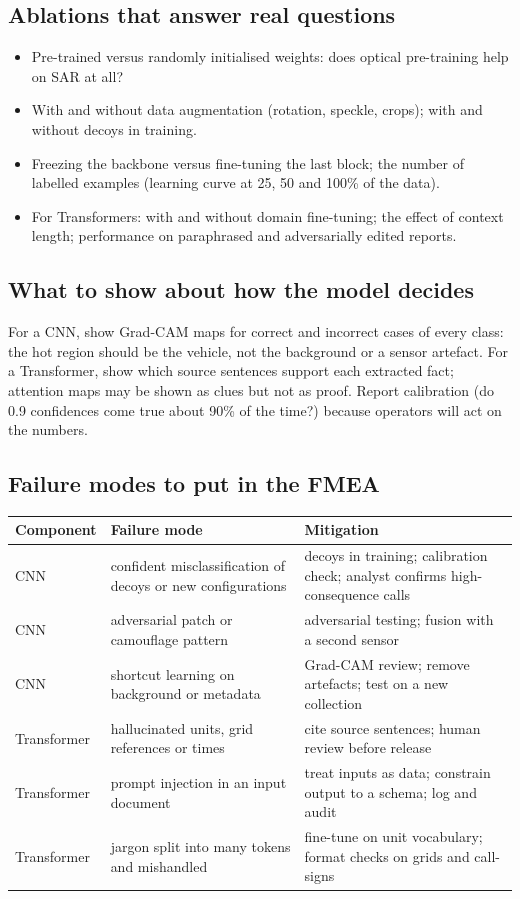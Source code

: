 \documentclass[11pt]{article}
\begin{document}
\subsection{Ablations that answer real questions}
\begin{itemize}
\item Pre-trained versus randomly initialised weights: does optical pre-training help on SAR at all?
\item With and without data augmentation (rotation, speckle, crops); with and without decoys in training.
\item Freezing the backbone versus fine-tuning the last block; the number of labelled examples (learning curve at 25, 50 and 100\% of the data).
\item For Transformers: with and without domain fine-tuning; the effect of context length; performance on paraphrased and adversarially edited reports.
\end{itemize}

\subsection{What to show about how the model decides}
For a CNN, show Grad-CAM maps for correct and incorrect cases of every class: the hot region should be the vehicle, not the background or a sensor artefact. For a Transformer, show which source sentences support each extracted fact; attention maps may be shown as clues but not as proof. Report calibration (do 0.9 confidences come true about 90\% of the time?) because operators will act on the numbers.

\subsection{Failure modes to put in the FMEA}
\begin{center}\small\renewcommand{\arraystretch}{1.3}
\begin{tabularx}{\textwidth}{@{}l X X@{}}\toprule
\textbf{Component} & \textbf{Failure mode} & \textbf{Mitigation}\\\midrule
CNN & confident misclassification of decoys or new configurations & decoys in training; calibration check; analyst confirms high-consequence calls\\
CNN & adversarial patch or camouflage pattern & adversarial testing; fusion with a second sensor\\
CNN & shortcut learning on background or metadata & Grad-CAM review; remove artefacts; test on a new collection\\
Transformer & hallucinated units, grid references or times & cite source sentences; human review before release\\
Transformer & prompt injection in an input document & treat inputs as data; constrain output to a schema; log and audit\\
Transformer & jargon split into many tokens and mishandled & fine-tune on unit vocabulary; format checks on grids and call-signs\\\bottomrule
\end{tabularx}\end{center}
\end{document}
